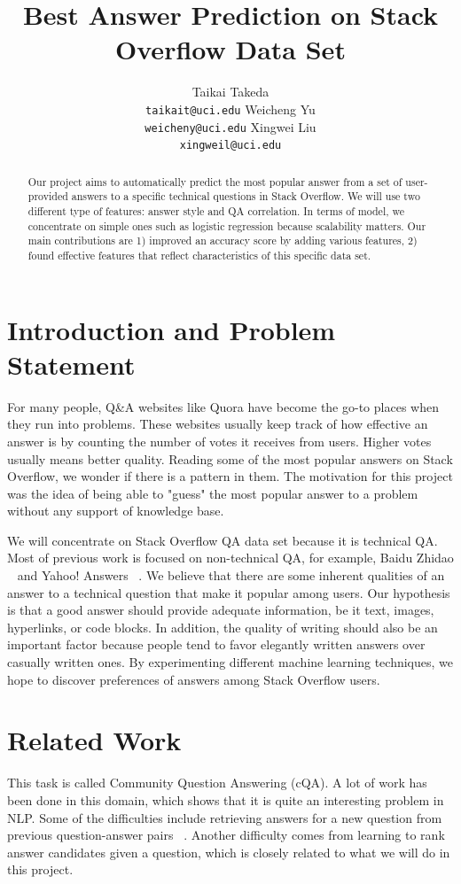 \documentclass[11pt]{article}
\title{Best Answer Prediction on Stack Overflow Data Set}
\author{Taikai Takeda\\
	    {\tt taikait@uci.edu}
	  \And
	Weicheng Yu\\
  {\tt weicheny@uci.edu}
  \And 
  Xingwei Liu \\
  {\tt xingweil@uci.edu}
  }
\date{}
\begin{document}
\maketitle

\begin{abstract}
Our project aims to automatically predict the most popular answer from a set of user-provided answers to a specific technical questions in Stack Overflow. We will use two different type of features: answer style and QA correlation. In terms of model, we concentrate on simple ones such as logistic regression because scalability matters. Our main contributions are 1) improved an accuracy score by adding various features, 2) found effective features that reflect characteristics of this specific data set.
\end{abstract}

\section{Introduction and Problem Statement}
For many people, Q\&A websites like Quora have become the go-to places when they run into problems. These websites usually keep track of how effective an answer is by counting the number of votes it receives from users. Higher votes usually means better quality. Reading some of the most popular answers on Stack Overflow, we wonder if there is a pattern in them. The motivation for this project was the idea of being able to "guess" the most popular answer to a problem without any support of knowledge base.

We will concentrate on Stack Overflow QA data set because it is technical QA. Most of previous work is focused on non-technical QA, for example, Baidu Zhidao ~\cite{Wang2010} and Yahoo! Answers ~\cite{Surdeanu2011,Qiu2015}. We believe that there are some inherent qualities of an answer to a technical question that make it popular among users. Our hypothesis is that a good answer should provide adequate information, be it text, images, hyperlinks, or code blocks. In addition, the quality of writing should also be an important factor because people tend to favor elegantly written answers over casually written ones. By experimenting different machine learning techniques, we hope to discover preferences of answers among Stack Overflow users.

\section{Related Work}
This task is called Community Question Answering (cQA). A lot of work has been done in this domain, which shows that it is quite an interesting problem in NLP. Some of the difficulties include retrieving answers for a new question from previous question-answer pairs ~\cite{Zhou2016}. Another difficulty comes from learning to rank answer candidates given a question, which is closely related to what we will do in this project.
\end{document}
